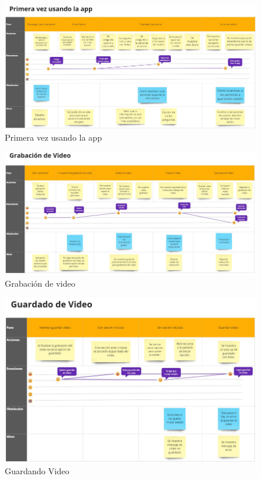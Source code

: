 \begin{figure} [H]
    \centering
    \includegraphics[width=1\linewidth]{figuras/mapa_exp1.png}
    \caption{Primera vez usando la app}
    \label{fig:enter-label}
\end{figure}

\begin{figure} [H]
    \centering
    \includegraphics[width=1\linewidth]{figuras/mapa_exp2.png}
    \caption{Grabación de video}
    \label{fig:enter-label}
\end{figure}


\begin{figure} [H]
    \centering
    \includegraphics[width=1\linewidth]{figuras/mapa_exp3.png}
    \caption{Guardando Video}
    \label{fig:enter-label}
\end{figure}

